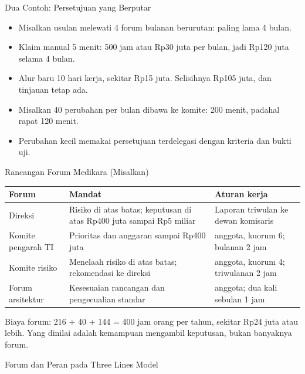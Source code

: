 \documentclass[aspectratio=169, table, 12pt]{beamer}
\begin{document}
\begin{frame}{{\Large Dua Contoh: Persetujuan yang Berputar}}
  \vspace{6pt}
  \small
  \begin{itemize}
    \item Misalkan usulan melewati 4 forum bulanan berurutan: paling lama 4 bulan.
    \item Klaim manual 5 menit: 500 jam atau Rp30 juta per bulan, jadi Rp120 juta selama 4 bulan.
    \item Alur baru 10 hari kerja, sekitar Rp15 juta. Selisihnya Rp105 juta, dan tinjauan tetap ada.
    \item Misalkan 40 perubahan per bulan dibawa ke komite: 200 menit, padahal rapat 120 menit.
    \item Perubahan kecil memakai persetujuan terdelegasi dengan kriteria dan bukti uji.
  \end{itemize}
\end{frame}

\begin{frame}{{\Large Rancangan Forum Medikara (Misalkan)}}
  \vspace{2pt}
  \scriptsize
  \begin{tabularx}{\textwidth}{|>{\raggedright\arraybackslash}p{}|>{\raggedright\arraybackslash}X|>{\raggedright\arraybackslash}X|}
    \hline
    \textbf{Forum} & \textbf{Mandat} & \textbf{Aturan kerja} \\ \hline
    Direksi & Risiko di atas batas; keputusan di atas Rp400 juta sampai Rp5 miliar & Laporan
    triwulan ke dewan komisaris \\ \hline
    Komite pengarah TI & Prioritas dan anggaran sampai Rp400 juta & 9 anggota, kuorum 6; bulanan
    2 jam \\ \hline
    Komite risiko & Menelaah risiko di atas batas; rekomendasi ke direksi & 5 anggota, kuorum 4;
    triwulanan 2 jam \\ \hline
    Forum arsitektur & Kesesuaian rancangan dan pengecualian standar & 6 anggota; dua kali sebulan 1
    jam \\ \hline
  \end{tabularx}

  \vspace{6pt}
  \small Biaya forum: 216 + 40 + 144 = 400 jam orang per tahun, sekitar Rp24 juta atau lebih. Yang
  dinilai adalah kemampuan mengambil keputusan, bukan banyaknya forum.
\end{frame}

\begin{frame}{{\Large Forum dan Peran pada Three Lines Model}}
  \begin{center}
    \resizebox{!}{0.74\textheight}{}
  \end{center}
\end{frame}
\end{document}
